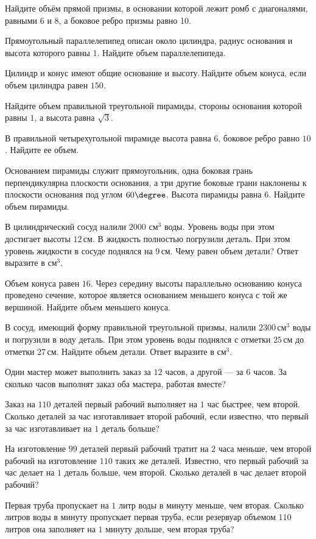 \begin{class}[number=10]
\begin{listofex}
		\item Найдите объём прямой призмы, в основании которой лежит ромб с диагоналями, равными \(6\) и \(8\), а боковое ребро призмы равно 10.
		\item Прямоугольный параллелепипед описан около цилиндра, радиус основания и высота которого равны \(1\). Найдите объем параллелепипеда.
		\item Цилиндр и конус имеют общие основание и высоту. Найдите объем конуса, если объем цилиндра равен \(150\).
		\item Найдите объем правильной треугольной пирамиды, стороны основания которой равны \(1\), а высота равна \(\sqrt{3}\).
		\item В правильной четырехугольной пирамиде высота равна \(6\), боковое ребро равно \(10\). Найдите ее объем.
		\item Основанием пирамиды служит прямоугольник, одна боковая грань перпендикулярна плоскости основания, а три другие боковые грани наклонены к плоскости основания под углом \(60\degree \). Высота пирамиды равна \(6\). Найдите объем пирамиды.
		\item В цилиндрический сосуд налили \(2000\) см\(^3\) воды. Уровень воды при этом достигает высоты \(12\) см. В жидкость полностью погрузили деталь. При этом уровень жидкости в сосуде поднялся на \(9\) см. Чему равен объем детали? Ответ выразите в см\(^3\).
		\item Объем конуса равен \(16\). Через середину высоты параллельно основанию конуса проведено сечение, которое является основанием меньшего конуса с той же вершиной. Найдите объем меньшего конуса.
		\item В сосуд, имеющий форму правильной треугольной призмы, налили \(2300\) см\(^3\) воды и погрузили в воду деталь. При этом уровень воды поднялся с отметки \(25\) см до отметки \(27\) см. Найдите объем детали. Ответ выразите в см\(^3\).
		\item Один мастер может выполнить заказ за \( 12 \) часов, а другой --- за \( 6 \) часов. За сколько часов выполнят заказ оба мастера, работая вместе?
		\item Заказ на \( 110 \) деталей первый рабочий выполняет на \( 1 \) час быстрее, чем второй. Сколько деталей за час изготавливает второй рабочий, если известно, что первый за час изготавливает на \( 1 \) деталь больше?
		\item На изготовление \( 99 \) деталей первый рабочий тратит на \( 2 \) часа меньше, чем второй рабочий на изготовление \( 110 \) таких же деталей. Известно, что первый рабочий за час делает на \( 1 \) деталь больше, чем второй. Сколько деталей в час делает второй рабочий?
		\item Первая труба пропускает на \( 1 \) литр воды в минуту меньше, чем вторая. Сколько литров воды в минуту пропускает первая труба, если резервуар объемом \( 110 \) литров она заполняет на \( 1 \) минуту дольше, чем вторая труба?
	\end{listofex}
\end{class}
